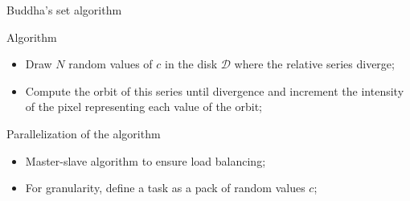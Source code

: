 \documentclass[compress,10pt,aspectratio=169]{beamer}
\begin{document}
\begin{frame}[fragile]{Buddha's set algorithm}
    \begin{exampleblock}{Algorithm}
        \begin{itemize}
            \item Draw $N$ random values of $c$ in the disk $\mathcal{D}$ where the relative series diverge;
            \item Compute the orbit of this series until divergence and increment the intensity of the pixel
                  representing each value of the orbit;            
        \end{itemize}
    \end{exampleblock}

    \begin{alertblock}{Parallelization of the algorithm}
        \begin{itemize}
            \item Master-slave algorithm to ensure load balancing;
            \item For granularity, define a task as a pack of random values $c$;
        \end{itemize}
    \end{alertblock}
\end{frame}
\end{document}
